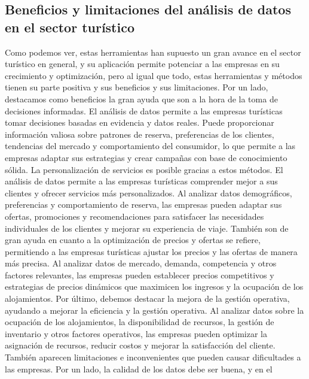 \documentclass[
  letterpaper,
  DIV=11,
  numbers=noendperiod]{scrreprt}
\begin{document}
\hypertarget{beneficios-y-limitaciones-del-anuxe1lisis-de-datos-en-el-sector-turuxedstico}{%
\subsection{Beneficios y limitaciones del análisis de datos en el sector
turístico}\label{beneficios-y-limitaciones-del-anuxe1lisis-de-datos-en-el-sector-turuxedstico}}

Como podemos ver, estas herramientas han supuesto un gran avance en el
sector turístico en general, y su aplicación permite potenciar a las
empresas en su crecimiento y optimización, pero al igual que todo, estas
herramientas y métodos tienen su parte positiva y sus beneficios y sus
limitaciones. Por un lado, destacamos como beneficios la gran ayuda que
son a la hora de la toma de decisiones informadas. El análisis de datos
permite a las empresas turísticas tomar decisiones basadas en evidencia
y datos reales. Puede proporcionar información valiosa sobre patrones de
reserva, preferencias de los clientes, tendencias del mercado y
comportamiento del consumidor, lo que permite a las empresas adaptar sus
estrategias y crear campañas con base de conocimiento sólida. La
personalización de servicios es posible gracias a estos métodos. El
análisis de datos permite a las empresas turísticas comprender mejor a
sus clientes y ofrecer servicios más personalizados. Al analizar datos
demográficos, preferencias y comportamiento de reserva, las empresas
pueden adaptar sus ofertas, promociones y recomendaciones para
satisfacer las necesidades individuales de los clientes y mejorar su
experiencia de viaje. También son de gran ayuda en cuanto a la
optimización de precios y ofertas se refiere, permitiendo a las empresas
turísticas ajustar los precios y las ofertas de manera más precisa. Al
analizar datos de mercado, demanda, competencia y otros factores
relevantes, las empresas pueden establecer precios competitivos y
estrategias de precios dinámicos que maximicen los ingresos y la
ocupación de los alojamientos. Por último, debemos destacar la mejora de
la gestión operativa, ayudando a mejorar la eficiencia y la gestión
operativa. Al analizar datos sobre la ocupación de los alojamientos, la
disponibilidad de recursos, la gestión de inventario y otros factores
operativos, las empresas pueden optimizar la asignación de recursos,
reducir costos y mejorar la satisfacción del cliente. También aparecen
limitaciones e inconvenientes que pueden causar dificultades a las
empresas. Por un lado, la calidad de los datos debe ser buena, y en el
\end{document}
